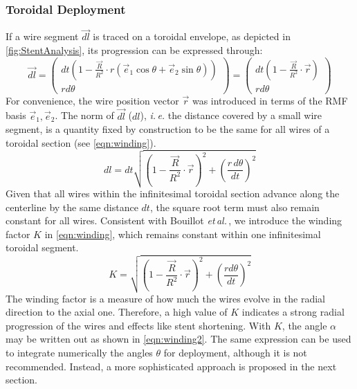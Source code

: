 \subsubsection*{Toroidal Deployment}
If a wire segment $\vec{dl}$ is traced on a toroidal envelope, as depicted in \autoref{fig:StentAnalysis}, its progression can be expressed through:
\begin{equation*}
	\vec{dl} = \begin{pmatrix}
		dt(1-\frac{\vec{R}}{R^2}\cdot r(\vec{e}_1\cos{\theta} + \vec{e}_2\sin{\theta})) \\rd\theta
	\end{pmatrix} = \begin{pmatrix}
		dt(1-\frac{\vec{R}}{R^2}\cdot \vec{r}) \\rd\theta
	\end{pmatrix}
\end{equation*}
For convenience, the wire position vector $\vec{r}$ was introduced in terms of the RMF basis $\vec{e}_1, \vec{e}_2$. The norm of $\vec{dl}$ ($dl$), \textit{i.\,e.} the distance covered by a small wire segment, is a quantity fixed by construction to be the same for all wires of a toroidal section (see \autoref{eqn:winding}).
\begin{equation}
	dl = dt\sqrt{{\left(1 - \frac{\vec{R}}{R^2}\cdot \vec{r}\right)}^2 + {\left(\frac{r\,d\theta}{dt}\right)}^2 }
	\label{eqn:winding}
\end{equation}
Given that all wires within the infinitesimal toroidal section advance along the centerline by the same distance $dt$, the square root term must also remain constant for all wires. Consistent with Bouillot \textit{et\,al.}\,\cite{Bouillot2016}, we introduce the winding factor $K$ in \autoref{eqn:winding}, which remains constant within one infinitesimal toroidal segment.
\begin{equation}
	K = \sqrt{{\left(1 - \frac{\vec{R}}{R^2}\cdot \vec{r}\right)}^2 + {\left(\frac{rd\theta}{dt}\right)}^2 }
	\label{eqn:winding_factor}
\end{equation}
The winding factor is a measure of how much the wires evolve in the radial direction to the axial one. Therefore, a high value of $K$ indicates a strong radial progression of the wires and effects like stent shortening. With $K$, the angle $\alpha$ may be written out as shown in \autoref{eqn:winding2}. The same expression can be used to integrate numerically the angles $\theta$ for deployment, although it is not recommended. Instead, a more sophisticated approach is proposed in the next section.
